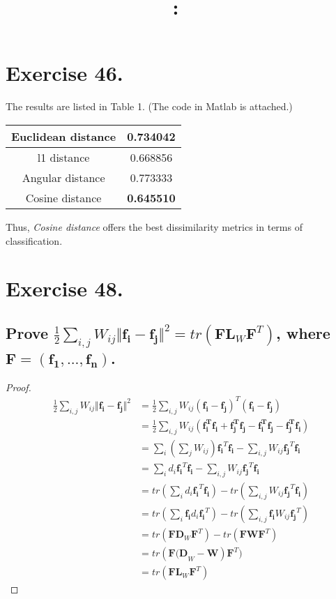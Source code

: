 \documentclass{article}
\date{}
\title{
    \textmd{\textbf{\hmwkClass:\ \hmwkTitle}}\\
}
\author{\hmwkAuthorName}
\begin{document}
\maketitle

\section{Exercise 46.}
The results are listed in Table 1. (The code in Matlab is attached.) 
\begin{table}[h]
\centering
\begin{tabular}{c|c}
\hline
Euclidean distance&0.734042\\
\hline
l1 distance&0.668856\\
\hline
Angular distance&0.773333\\
\hline
Cosine distance&\textbf{0.645510}\\
\hline
\end{tabular}
\end{table}

Thus, \textit{Cosine distance} offers the best dissimilarity metrics in terms of classification.
\section{Exercise 48.}
\subsection{Prove $\frac{1}{2}\sum_{i,j} W_{ij}\Vert \mathbf{f_i-f_j}\Vert^2 = tr(\mathbf{F}\mathbf{L}_{W}\mathbf{F}^T)$, where $\mathbf{F} =(\mathbf{f_1,...,f_n})$. }
\begin{proof}
\begin{align*}
\frac{1}{2}\sum_{i,j} W_{ij} \Vert\mathbf{f_i-f_j}\Vert^2 &= 
\frac{1}{2}\sum_{i,j}  W_{ij} (\mathbf{f_i-f_j})^T (\mathbf{f_i-f_j}) \\
&= \frac{1}{2}\sum_{i,j}  W_{ij} (\mathbf{f_i^Tf_i+f_j^Tf_j-f_{i}^Tf_{j}-f_{j}^Tf_{i}}) \\
&= \sum_{i} (\sum_{j} W_{ij})\mathbf{f_{i}}^T \mathbf{f_{i}} - \sum_{i,j} W_{ij}\mathbf{f_{j}}^T \mathbf{f_{i}}\\
&= \sum_{i} d_i\mathbf{f_{i}}^T \mathbf{f_{i}} - \sum_{i,j} W_{ij}\mathbf{f_{j}}^T \mathbf{f_{i}}\\
&= tr(\sum_{i}d_{i}\mathbf{f_{i}}^T \mathbf{f_{i}} ) - tr(\sum_{i,j} W_{ij}\mathbf{f_{j}}^T \mathbf{f_{i}})\\
&=tr(\sum_{i}\mathbf{f_{i}}d_{i}\mathbf{f_{i}}^T ) - tr(\sum_{i,j} \mathbf{f_{i}}W_{ij}\mathbf{f_{j}}^T) \\
&=tr(\mathbf{FD}_W\mathbf{F}^T) - tr(\mathbf{FWF}^T)\\
&=tr(\mathbf{F(D}_W-\mathbf W)\mathbf{F}^T)\\
&=tr(\mathbf{FL}_{W}\mathbf{F}^T)
\end{align*}
\end{proof}
\end{document}
